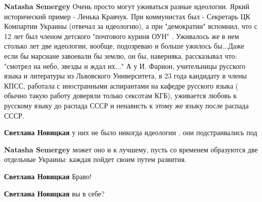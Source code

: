 \begin{itemize}
\begin{itemize}
\textbf{Natasha Semergey} Очень просто могут уживаться разные идеологии. Яркий
исторический пример - Ленька Кравчук. При коммунистах был - Секретарь ЦК
Компартии Украины (отвечал за идеологию), а при "демократии" вспомнил, что с 12
лет был членом детского "почтового куриня ОУН" . Уживалось же в нем столько лет
две идеологии, вообще, подозреваю и больше ужилось бы...Даже если бы марсиане
завоевали бы землю, он бы, наверняка, рассказывал что: "смотрел на небо, звезды
и ждал их..." А у И. Фарион, учительницы русского языка и литературы из
Львовского Университета, в 23 года кандидату в члены КПСС, работала с
иностранными аспирантами на кафедре русского языка ( обычно такую работу
доверяли только сексотам КГБ), уживается любовь к русскому языку до распада
СССР и ненависть к этому же языку после распада СССР.

 
\textbf{Светлана Новицкая} у них не было никогда идеологии . они подстраивались под

 
\textbf{Natasha Semergey} может оно и к лучшему, пусть со временем образуются две отдельные Украины: каждая пойдет своим путем развития.

 
\textbf{Светлана Новицкая} Браво!

 
\textbf{Светлана Новицкая} вы в себе?

 

\end{itemize}
\end{itemize}
